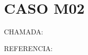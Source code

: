 \documentclass{undftex}
\begin{document}
\section*{CASO M02}\noindent CHAMADA:
\par\noindent REFERENCIA:\par\printbibliography[heading=none]
\end{document}
